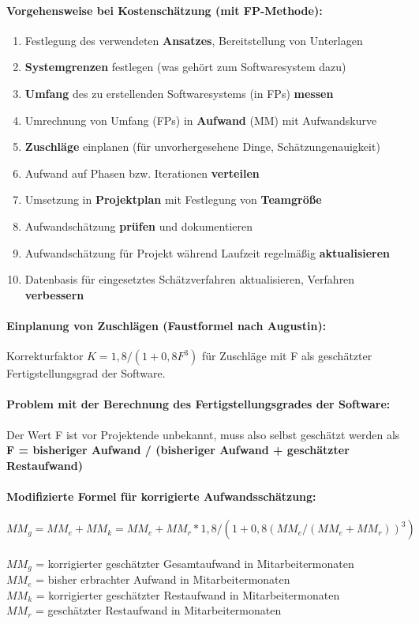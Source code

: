 \paragraph{Vorgehensweise bei Kostenschätzung (mit FP-Methode):}
\begin{enumerate}
	\item Festlegung des verwendeten \textbf{Ansatzes}, Bereitstellung von Unterlagen
	\item \textbf{Systemgrenzen} festlegen (was gehört zum Softwaresystem dazu)
	\item \textbf{Umfang} des zu erstellenden Softwaresystems (in FPs) \textbf{messen}
	\item Umrechnung von Umfang (FPs) in \textbf{Aufwand} (MM) mit Aufwandskurve
	\item \textbf{Zuschläge} einplanen (für unvorhergesehene Dinge, Schätzungenauigkeit)
	\item Aufwand auf Phasen bzw. Iterationen \textbf{verteilen}
	\item Umsetzung in \textbf{Projektplan} mit Festlegung von \textbf{Teamgröße}
	\item Aufwandschätzung \textbf{prüfen} und dokumentieren
	\item Aufwandschätzung für Projekt während Laufzeit regelmäßig \textbf{aktualisieren}
	\item Datenbasis für eingesetztes Schätzverfahren aktualisieren, Verfahren \textbf{verbessern}
\end{enumerate}

\paragraph{Einplanung von Zuschlägen (Faustformel nach Augustin):}
Korrekturfaktor $K = 1,8/(1+0,8 F^3)$ für Zuschläge mit F als geschätzter Fertigstellungsgrad der Software.

\paragraph{Problem mit der Berechnung des Fertigstellungsgrades der Software:}
Der Wert F ist vor Projektende unbekannt, muss also selbst geschätzt werden als \textbf{F = bisheriger Aufwand / (bisheriger Aufwand + geschätzter Restaufwand)}

\paragraph{Modifizierte Formel für korrigierte Aufwandsschätzung:}
$MM_{g} = MM_{e} + MM_{k} = MM_{e} + MM_{r}*1,8/(1 + 0,8(MM_{e}/(MM_{e} + MM_{r}))^3)$
\\
\\
$MM_{g}$ = korrigierter geschätzter Gesamtaufwand in Mitarbeitermonaten
\\
$MM_{e}$ = bisher erbrachter Aufwand in Mitarbeitermonaten
\\
$MM_{k}$ = korrigierter geschätzter Restaufwand in Mitarbeitermonaten
\\
$MM_{r}$ = geschätzter Restaufwand in Mitarbeitermonaten
\\

